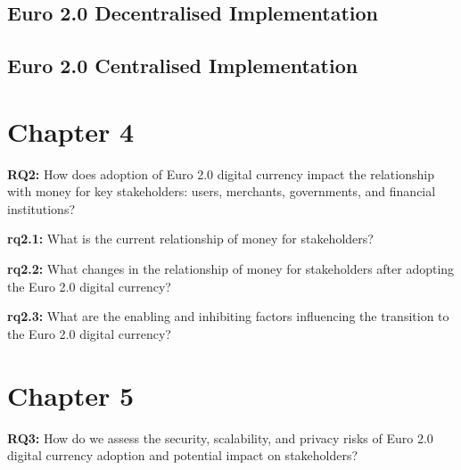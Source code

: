 \documentclass[12pt]{article} %
\begin{document}
{{\subsection{Euro 2.0 Decentralised Implementation} \label{ssec:3.4}

\subsection{Euro 2.0 Centralised Implementation} \label{ssec:3.5}

\pagebreak

\section{Chapter 4} \label{sec:4}


\begin{quoting}
	\textbf{RQ2:} How does adoption of Euro 2.0 digital currency impact the relationship with money for key stakeholders: users, merchants, governments, and financial institutions?
\end{quoting}

\begin{quoting}
	\textbf{rq2.1:} What is the current relationship of money for stakeholders?
\end{quoting}
\begin{quoting}
	\textbf{rq2.2:} What changes in the relationship of money for stakeholders after adopting the Euro 2.0 digital currency?
\end{quoting}
\begin{quoting}
	\textbf{rq2.3:} What are the enabling and inhibiting factors influencing the transition to the Euro 2.0 digital currency?
\end{quoting}

\pagebreak

\section{Chapter 5} \label{sec:5}


\begin{quoting}
	\textbf{RQ3:} How do we assess the security, scalability, and privacy risks of Euro 2.0 digital currency adoption and potential impact on stakeholders?
\end{quoting}

}}
\end{document}
